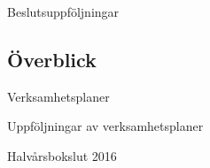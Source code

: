 \documentclass[10pt]{article}
\begin{document}

\newpage
\begin{supersection}{Beslutsuppföljningar}{}
    \subsection{Överblick}
    \begin{busek}

    \end{busek}
    \newpage

\end{supersection}
\begin{utskottsrapporter}
%    
%    
%    
%    
%    
%    
%    
%    
%    
%    
%    
\end{utskottsrapporter}
\begin{supersection}{Verksamhetsplaner}{}
%    
\end{supersection}
\begin{supersection}{Uppföljningar av verksamhetsplaner}{}
%    
%    
\end{supersection}

\begin{motioner}
\end{motioner}

\begin{propositioner}
\end{propositioner}
\begin{supersection}{Halvårsbokslut 2016}{}
%    
%    
%    
%    
%    
%    
%    
%    
%    
%    
%    
%    
%    
%    
%    
%    
%    
%    
%    
%    
%    
%    
\end{supersection}
\end{document}
